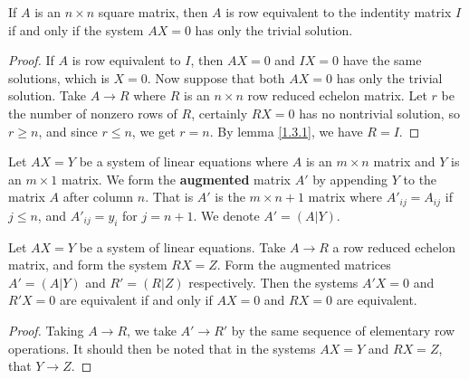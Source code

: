 \begin{theorem}\label{1.3.4}
    If $A$ is an  $n \times n$ square matrix, then  $A$ is row equivalent to the indentity matrix
    $I$ if and only if the system  $AX=0$ has only the trivial solution.
\end{theorem}
\begin{proof}
    If $A$ is row equivalent to  $I$, then  $AX=0$ and  $IX=0$ have the same solutions, which is
    $X=0$. Now suppose that both  $AX=0$ has only the trivial solution. Take $A \rightarrow R$ where
    $R$ is an  $n \times n$ row reduced echelon matrix. Let  $r$ be the number of nonzero rows of
    $R$, certainly  $RX=0$ has no nontrivial solution, so  $r \geq n$, and since  $r \leq n$, we get
     $r=n$. By lemma \ref {1.3.1}, we have $R=I$.
\end{proof}

\begin{definition}
    Let $AX=Y$ be a system of linear equations where  $A$ is an $m \times n$ matrix and $Y$ is an
    $m \times 1$ matrix. We form the \textbf{augmented} matrix $A'$ by appending  $Y$ to the 
    matrix $A$ after column  $n$. That is  $A'$ is the  $m \times n+1$ matrix where  $A'_{ij}=A_{ij}$ 
    if $j \leq n$, and  $A'_{ij}=y_i$ for $j=n+1$. We denote  $A'=(A|Y)$.
\end{definition}

\begin{lemma}\label{1.3.5}
    Let $AX=Y$ be a system of linear equations. Take  $A \rightarrow R$ a row reduced echelon
    matrix, and form the system $RX=Z$. Form the augmented matrices  $A'=(A|Y)$ and $R'=(R|Z)$
    respectively. Then the systems $A'X=0$ and  $R'X=0$ are equivalent if and only if  $AX=0$ and
    $RX=0$ are equivalent.
\end{lemma}
\begin{proof}
    Taking $A \rightarrow R$, we take $A' \rightarrow R'$ by the same sequence of elementary row
    operations. It should then be noted that in the systems $AX=Y$ and  $RX=Z$, that  $Y \rightarrow
    Z$.
\end{proof}

